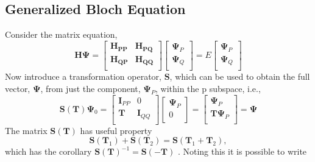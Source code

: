 \documentclass[12pt]{article}
\begin{document}
\subsection{ Generalized Bloch Equation } 
Consider the matrix equation,
\begin{equation}
\mathbf{H}\boldsymbol{\Psi} =
\begin{bmatrix}
 \mathbf{H_{PP}} & \mathbf{H_{PQ}} \\ 
 \mathbf{H_{QP}} & \mathbf{H_{QQ}} \\ 
\end{bmatrix} 
\begin{bmatrix}
 \boldsymbol{\Psi}_{P} \\ 
 \boldsymbol{\Psi}_{Q} \\ 
\end{bmatrix} 
= E 
\begin{bmatrix}
 \boldsymbol{\Psi}_{P} \\ 
 \boldsymbol{\Psi}_{Q} \\ 
\end{bmatrix} 
\end{equation}
Now introduce a transformation operator, $\mathbf{S}$, which can be used to obtain the full 
vector, $\boldsymbol{\Psi}$, from just the component, $\boldsymbol{\Psi}_{P}$, within the $\mathrm{p}$ subspace, i.e.,
\begin{equation}
\mathbf{S}(\mathbf{T})\boldsymbol{\Psi}_{0}= 
\begin{bmatrix}
\mathbf{I}_{PP} & 0 \\ 
\mathbf{T} & \mathbf{I}_{QQ} \\ 
\end{bmatrix}
\begin{bmatrix}
\boldsymbol{\Psi}_{P} \\ 
0 \\ 
\end{bmatrix}=  
\begin{bmatrix}
\boldsymbol{\Psi}_{P} \\ 
\mathbf{T}\boldsymbol{\Psi}_{P} \\ 
\end{bmatrix} 
= \boldsymbol{\Psi}
\end{equation}
The matrix $\mathbf{S}(\mathbf{T})$ has useful property
\begin{equation}
\mathbf{S}(\mathbf{T}_{1})+ \mathbf{S}(\mathbf{T}_{2})=\mathbf{S}(\mathbf{T}_{1}+\mathbf{T}_{2}),
\end{equation}
which has the corollary  $\mathbf{S}(\mathbf{T})^{-1}=\mathbf{S}(-\mathbf{T})$ . Noting this it is possible to write
\end{document}
